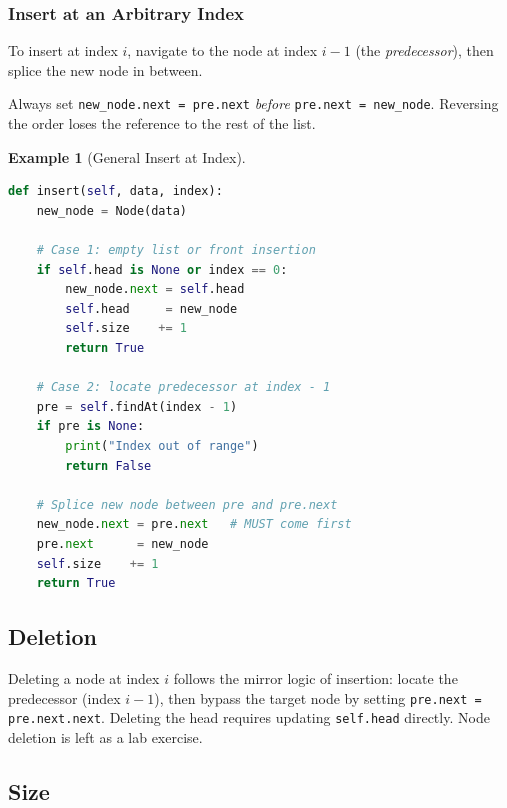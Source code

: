 \documentclass[11pt, a4paper, notitlepage]{report}
\theoremstyle{definition}
\theoremstyle{remark}
\theoremstyle{definition}
\newtheorem{example}[theorem]{Example}
\begin{document}
\subsubsection{Insert at an Arbitrary Index}
\label{subsubsec:insert-index}

To insert at index \(i\), navigate to the node at index \(i-1\) (the
\emph{predecessor}), then splice the new node in between.

\begin{warning}[title={Warning: Order of Pointer Updates Matters}]
Always set \texttt{new\_node.next = pre.next} \emph{before}
\texttt{pre.next = new\_node}. Reversing the order loses the reference to
the rest of the list.
\end{warning}

\begin{example}[General Insert at Index]
\leavevmode
\begin{lstlisting}[language=Python]
def insert(self, data, index):
    new_node = Node(data)

    # Case 1: empty list or front insertion
    if self.head is None or index == 0:
        new_node.next = self.head
        self.head     = new_node
        self.size    += 1
        return True

    # Case 2: locate predecessor at index - 1
    pre = self.findAt(index - 1)
    if pre is None:
        print("Index out of range")
        return False

    # Splice new node between pre and pre.next
    new_node.next = pre.next   # MUST come first
    pre.next      = new_node
    self.size    += 1
    return True
\end{lstlisting}
\end{example}

\subsection{Deletion}
\label{subsec:ll-delete}

Deleting a node at index \(i\) follows the mirror logic of insertion: locate
the predecessor (index \(i-1\)), then bypass the target node by setting
\texttt{pre.next = pre.next.next}. Deleting the head requires updating
\texttt{self.head} directly. Node deletion is left as a lab exercise.

\subsection{Size}
\label{subsec:ll-size}
\end{document}
